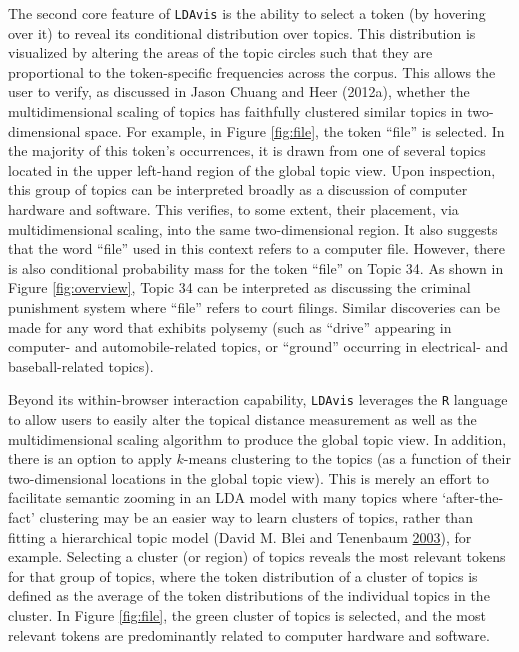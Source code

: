 \documentclass[12pt,]{isuthesis}
\begin{document}
The second core feature of \texttt{LDAvis} is the ability to select a
token (by hovering over it) to reveal its conditional distribution over
topics. This distribution is visualized by altering the areas of the
topic circles such that they are proportional to the token-specific
frequencies across the corpus. This allows the user to verify, as
discussed in Jason Chuang and Heer (2012a), whether the multidimensional
scaling of topics has faithfully clustered similar topics in
two-dimensional space. For example, in Figure \ref{fig:file}, the token
``file'' is selected. In the majority of this token's occurrences, it is
drawn from one of several topics located in the upper left-hand region
of the global topic view. Upon inspection, this group of topics can be
interpreted broadly as a discussion of computer hardware and software.
This verifies, to some extent, their placement, via multidimensional
scaling, into the same two-dimensional region. It also suggests that the
word ``file'' used in this context refers to a computer file. However,
there is also conditional probability mass for the token ``file'' on
Topic 34. As shown in Figure \ref{fig:overview}, Topic 34 can be
interpreted as discussing the criminal punishment system where ``file''
refers to court filings. Similar discoveries can be made for any word
that exhibits polysemy (such as ``drive'' appearing in computer- and
automobile-related topics, or ``ground'' occurring in electrical- and
baseball-related topics).

Beyond its within-browser interaction capability, \texttt{LDAvis}
leverages the \texttt{R} language to allow users to easily alter the
topical distance measurement as well as the multidimensional scaling
algorithm to produce the global topic view. In addition, there is an
option to apply \(k\)-means clustering to the topics (as a function of
their two-dimensional locations in the global topic view). This is
merely an effort to facilitate semantic zooming in an LDA model with
many topics where `after-the-fact' clustering may be an easier way to
learn clusters of topics, rather than fitting a hierarchical topic model
(David M. Blei and Tenenbaum
\protect\hyperlink{ref-Blei-hierarchical}{2003}), for example. Selecting
a cluster (or region) of topics reveals the most relevant tokens for
that group of topics, where the token distribution of a cluster of
topics is defined as the average of the token distributions of the
individual topics in the cluster. In Figure \ref{fig:file}, the green
cluster of topics is selected, and the most relevant tokens are
predominantly related to computer hardware and software.
\end{document}
